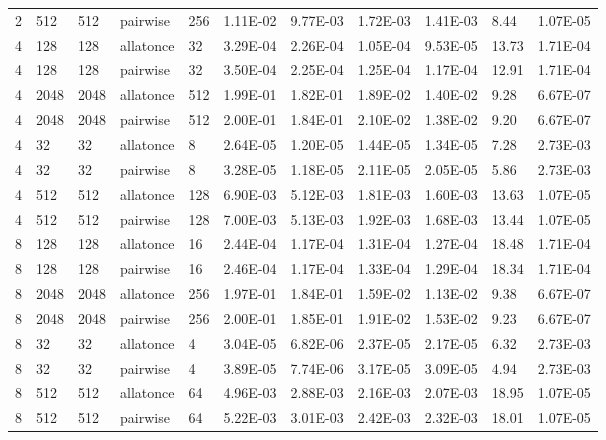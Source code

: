 \documentclass[11pt]{article}
\begin{document}
\begin{table}
\begin{adjustbox}{max width=\textwidth, max totalheight=0.95\textheight}
\begin{tabular}{lllllllllll}
      2   & 512  & 512  & pairwise  & 256  & 1.11E-02 & 9.77E-03 & 1.72E-03     & 1.41E-03 & 8.44   & 1.07E-05 \\
      4   & 128  & 128  & allatonce & 32   & 3.29E-04 & 2.26E-04 & 1.05E-04     & 9.53E-05 & 13.73  & 1.71E-04 \\
      4   & 128  & 128  & pairwise  & 32   & 3.50E-04 & 2.25E-04 & 1.25E-04     & 1.17E-04 & 12.91  & 1.71E-04 \\
      4   & 2048 & 2048 & allatonce & 512  & 1.99E-01 & 1.82E-01 & 1.89E-02     & 1.40E-02 & 9.28   & 6.67E-07 \\
      4   & 2048 & 2048 & pairwise  & 512  & 2.00E-01 & 1.84E-01 & 2.10E-02     & 1.38E-02 & 9.20   & 6.67E-07 \\
      4   & 32   & 32   & allatonce & 8    & 2.64E-05 & 1.20E-05 & 1.44E-05     & 1.34E-05 & 7.28   & 2.73E-03 \\
      4   & 32   & 32   & pairwise  & 8    & 3.28E-05 & 1.18E-05 & 2.11E-05     & 2.05E-05 & 5.86   & 2.73E-03 \\
      4   & 512  & 512  & allatonce & 128  & 6.90E-03 & 5.12E-03 & 1.81E-03     & 1.60E-03 & 13.63  & 1.07E-05 \\
      4   & 512  & 512  & pairwise  & 128  & 7.00E-03 & 5.13E-03 & 1.92E-03     & 1.68E-03 & 13.44  & 1.07E-05 \\
      8   & 128  & 128  & allatonce & 16   & 2.44E-04 & 1.17E-04 & 1.31E-04     & 1.27E-04 & 18.48  & 1.71E-04 \\
      8   & 128  & 128  & pairwise  & 16   & 2.46E-04 & 1.17E-04 & 1.33E-04     & 1.29E-04 & 18.34  & 1.71E-04 \\
      8   & 2048 & 2048 & allatonce & 256  & 1.97E-01 & 1.84E-01 & 1.59E-02     & 1.13E-02 & 9.38   & 6.67E-07 \\
      8   & 2048 & 2048 & pairwise  & 256  & 2.00E-01 & 1.85E-01 & 1.91E-02     & 1.53E-02 & 9.23   & 6.67E-07 \\
      8   & 32   & 32   & allatonce & 4    & 3.04E-05 & 6.82E-06 & 2.37E-05     & 2.17E-05 & 6.32   & 2.73E-03 \\
      8   & 32   & 32   & pairwise  & 4    & 3.89E-05 & 7.74E-06 & 3.17E-05     & 3.09E-05 & 4.94   & 2.73E-03 \\
      8   & 512  & 512  & allatonce & 64   & 4.96E-03 & 2.88E-03 & 2.16E-03     & 2.07E-03 & 18.95  & 1.07E-05 \\
      8   & 512  & 512  & pairwise  & 64   & 5.22E-03 & 3.01E-03 & 2.42E-03     & 2.32E-03 & 18.01  & 1.07E-05 \\

\end{tabular}
\end{adjustbox}
\end{table}
\end{document}
